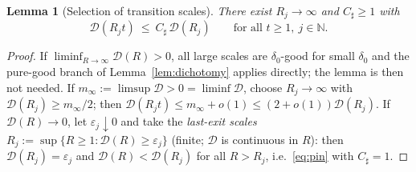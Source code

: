 \documentclass[11pt]{amsart}
\theoremstyle{plain}
\newtheorem{lemma}[theorem]{Lemma}
\theoremstyle{definition}
\theoremstyle{remark}
\begin{document}
\begin{lemma}[Selection of transition scales]\label{lem:select}
There exist $R_j\to\infty$ and $C_\sharp\ge1$ with
\begin{equation}\label{eq:pin}
  \mathcal D(R_jt)\ \le\ C_\sharp\,\mathcal D(R_j)
  \qquad\text{for all }t\ge1,\ j\in\mathbb N .
\end{equation}
\end{lemma}
\begin{proof}
If $\liminf_{R\to\infty}\mathcal D(R)>0$, all large scales are
$\delta_0$-good for small $\delta_0$ and the pure-good branch of
Lemma~\ref{lem:dichotomy} applies directly; the lemma is then not needed.
If $m_\infty:=\limsup\mathcal D>0=\liminf\mathcal D$, choose $R_j\to\infty$
with $\mathcal D(R_j)\ge m_\infty/2$; then
$\mathcal D(R_jt)\le m_\infty+o(1)\le(2+o(1))\mathcal D(R_j)$. If
$\mathcal D(R)\to0$, let $\varepsilon_j\downarrow0$ and take the
\emph{last-exit scales} $R_j:=\sup\{R\ge1:\mathcal D(R)\ge\varepsilon_j\}$
\textnormal{(}finite; $\mathcal D$ is continuous in $R$\textnormal{)}: then
$\mathcal D(R_j)=\varepsilon_j$ and $\mathcal D(R)<\mathcal D(R_j)$ for all
$R>R_j$, i.e.\ \eqref{eq:pin} with $C_\sharp=1$.
\end{proof}
\end{document}
